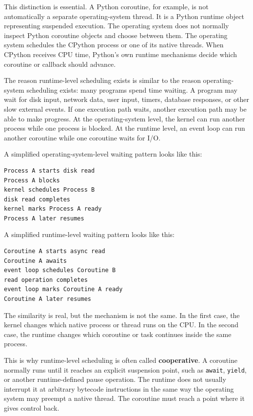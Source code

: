 This distinction is essential. A Python coroutine, for example, is not automatically a separate operating-system thread. It is a Python runtime object representing suspended execution. The operating system does not normally inspect Python coroutine objects and choose between them. The operating system schedules the CPython process or one of its native threads. When CPython receives CPU time, Python's own runtime mechanisms decide which coroutine or callback should advance.

The reason runtime-level scheduling exists is similar to the reason operating-system scheduling exists: many programs spend time waiting. A program may wait for disk input, network data, user input, timers, database responses, or other slow external events. If one execution path waits, another execution path may be able to make progress. At the operating-system level, the kernel can run another process while one process is blocked. At the runtime level, an event loop can run another coroutine while one coroutine waits for I/O.

A simplified operating-system-level waiting pattern looks like this:

\begin{verbatim}
Process A starts disk read
Process A blocks
kernel schedules Process B
disk read completes
kernel marks Process A ready
Process A later resumes
\end{verbatim}

A simplified runtime-level waiting pattern looks like this:

\begin{verbatim}
Coroutine A starts async read
Coroutine A awaits
event loop schedules Coroutine B
read operation completes
event loop marks Coroutine A ready
Coroutine A later resumes
\end{verbatim}

The similarity is real, but the mechanism is not the same. In the first case, the kernel changes which native process or thread runs on the CPU. In the second case, the runtime changes which coroutine or task continues inside the same process.

This is why runtime-level scheduling is often called \textbf{cooperative}. A coroutine normally runs until it reaches an explicit suspension point, such as \texttt{await}, \texttt{yield}, or another runtime-defined pause operation. The runtime does not usually interrupt it at arbitrary bytecode instructions in the same way the operating system may preempt a native thread. The coroutine must reach a point where it gives control back.

